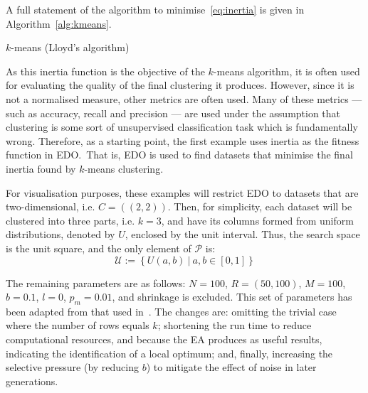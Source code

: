 A full statement of the algorithm to minimise~\eqref{eq:inertia} is given in
Algorithm~\ref{alg:kmeans}.

\balg%

\caption{\(k\)-means (Lloyd's algorithm)}\label{alg:kmeans}
\ealg%

As this inertia function is the objective of the \(k\)-means algorithm, it is
often used for evaluating the quality of the final clustering it produces.
However, since it is not a normalised measure, other metrics are often used.
Many of these metrics --- such as accuracy, recall and precision --- are used
under the assumption that clustering is some sort of unsupervised classification
task which is fundamentally wrong. Therefore, as a starting point, the first
example uses inertia as the fitness function in EDO.\ That is, EDO is used to
find datasets that minimise the final inertia found by \(k\)-means clustering.

For visualisation purposes, these examples will restrict EDO to datasets that
are two-dimensional, i.e. \(C = ((2, 2))\). Then, for simplicity, each dataset
will be clustered into three parts, i.e. \(k = 3\), and have its columns formed
from uniform distributions, denoted by \(U\), enclosed by the unit interval.
Thus, the search space is the unit square, and the only element of
\(\mathcal{P}\) is:
\begin{equation}\label{eq:uniform}
    \mathcal{U} := \left\{U(a, b)~|~a, b \in [0, 1]\right\}
\end{equation}


The remaining parameters are as follows: \(N=100\), \(R=(50,100)\), \(M=100\),
\(b=0.1\), \(l=0\), \(p_m=0.01\), and shrinkage is excluded. This set of
parameters has been adapted from that used in~\cite{Wilde2020:edo}. The changes
are: omitting the trivial case where the number of rows equals \(k\); shortening
the run time to reduce computational resources, and because the EA produces as
useful results, indicating the identification of a local optimum; and, finally,
increasing the selective pressure (by reducing \(b\)) to mitigate the effect of
noise in later generations.

